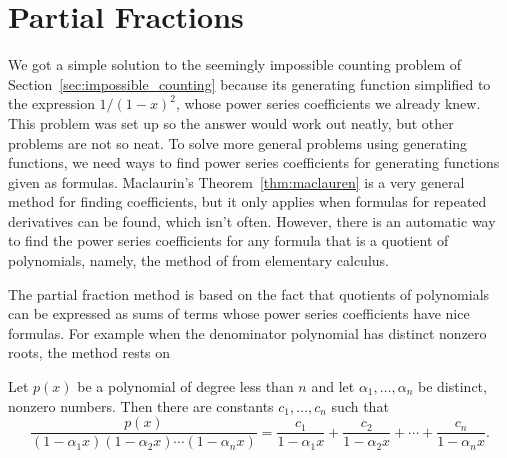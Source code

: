 \section{Partial Fractions}\label{sec:partial-fraction}

We got a simple solution to the seemingly impossible counting problem
of Section~\ref{sec:impossible_counting} because its generating
function simplified to the expression $1/(1-x)^2$, whose power series
coefficients we already knew.  This problem was set up so the answer
would work out neatly, but other problems are not so neat.  To solve
more general problems using generating functions, we need ways to find
power series coefficients for generating functions given as formulas.
Maclaurin's Theorem~\ref{thm:maclauren} is a very general method for
finding coefficients, but it only applies when formulas for repeated
derivatives can be found, which isn't often.  However, there is an
automatic way to find the power series coefficients for any formula
that is a quotient of polynomials, namely, the method of  from elementary calculus.

The partial fraction method is based on the fact that quotients of
polynomials can be expressed as sums of terms whose power series
coefficients have nice formulas.  For example when the denominator
polynomial has distinct nonzero roots, the method rests on
\begin{lemma}\label{lem:partial-fraction-distinct-roots}
  Let $p(x)$ be a polynomial of degree less than $n$ and let
  $\alpha_1, \dots, \alpha_n$ be distinct, nonzero numbers.  Then
  there are constants $c_1,\dots,c_n$ such that
\[
\frac{p(x)}{(1-\alpha_1 x)(1-\alpha_2 x)\cdots(1-\alpha_n x)} =
\frac{c_1}{1-\alpha_1 x} + \frac{c_2}{1-\alpha_2 x} + \cdots +
\frac{c_n}{1-\alpha_n x}.
\]
\end{lemma}

